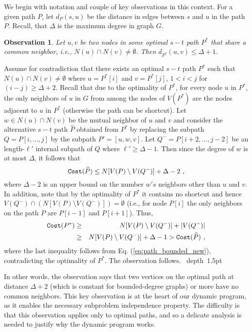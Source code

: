 \documentclass[12pt]{article}
\newtheorem{observation}[theorem]{Observation}
\def\Cost{\mbox{\tt Cost}}
\def\Proof{\par\noindent{\bf Proof:~}}
\def\blackslug{\hbox{\hskip 1pt \vrule width 4pt height 8pt
    depth 1.5pt \hskip 1pt}}
\def\QED{\quad\blackslug\lower 8.5pt\null\par}
\newcommand{\MAXDEG}[0]{\Delta}
\newcommand{\DegAnyConst}[0]{\MAXDEG+1}
\def\Cost{\mbox{\tt Cost}}
\begin{document}
We begin with notation and couple of key observations in this context.
For a given path $P$, let $d_{P}(s,u)$ be the distance in edges between $s$ and $u$ in the path $P$. Recall, that $\MAXDEG$ is the maximum degree in graph $G$.
\begin{observation}
\label{obs:opt_path_common}
Let $u,v$ be two nodes in some optimal $s-t$ path $P^{*}$ that share a common neighbor, i.e., $N(u) \cap N(v) \neq \emptyset$. Then $d_{P^{*}}(u,v)\leq \DegAnyConst$.
\end{observation}
\Proof
Assume for contradiction that there exists an optimal $s-t$ path $P^{*}$ such that
$N(u) \cap N(v) \neq \emptyset$ where $u=P^{*}[i]$ and $v=P^{*}[j]$, $1<i <j$ for $(i-j)\geq \MAXDEG+2$.
Recall that due to the optimality of $P^{*}$, for every node $u$ in $P^*$, the only neighbors of $u$ in $G$ from among the nodes of $V(P^{*})$ are the nodes adjacent to $u$ in $P^*$ (otherwise the path can be shortcut). Let $w \in N(u) \cap N(v)$ be the mutual neighbor of $u$ and $v$ and consider the alternative $s-t$ path $\widehat{P}$ obtained from $P^{*}$ by replacing the subpath $Q=P[i, \ldots, j]$ by the subpath $P'=[u, w, v]$. Let $Q^{-}=P[i+2, \ldots, j-2]$ be an length-$\ell'$ internal subpath of $Q$ where $\ell' \geq \MAXDEG-1$. Then since the  degree of $w$ is at most $\MAXDEG$, it follows that
\begin{equation}
\label{eq:path_bounded_new}
\Cost(\widehat{P}) \leq N[V(P)\setminus V(Q^-)]+\MAXDEG-2~,
\end{equation}
where $\MAXDEG-2$ is an upper bound on the number $w's$ neighbors other than $u$ and $v$.
In addition, note that by the optimality of $P^{*}$ it contains no shortcut and hence
$V(Q^{-}) \cap \left(N[V(P)\setminus V(Q^-)] \right)=\emptyset$
(i.e., for node $P[i]$ the only neighbors on the path $P$ are $P[i-1]$ and $P[i+1]$).
Thus,
\begin{eqnarray*}
\Cost(P^{*}) &\geq& N[V(P)\setminus V(Q^-)]+|V(Q^{-})|
\\&\geq&
N[V(P)\setminus V(Q^-)]+\MAXDEG-1 > \Cost(\widehat{P})~,
\end{eqnarray*}
where the last inequality follows from Eq. (\ref{eq:path_bounded_new}), contradicting the optimality of $P^{*}$. The observation follows.
\QED
In other words, the observation says that two vertices on the optimal path at distance $\MAXDEG+2$ (which is constant for bounded-degree graphs) or more have no common neighbors. This key observation is at the heart of our dynamic program, as it enables the necessary subproblem independence property. The difficulty is that this observation applies only to optimal paths, and so a delicate analysis is needed to justify why the dynamic program works.
\end{document}
